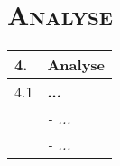 

\chapter{\textsc{Analyse} \label{analyse}}

\begin{table}[h] 
\begin{tabular}{@{}||l||l||@{}} \hline \hline 
 4.	 & \textbf{Analyse} \\ \hline \hline
 4.1 & \textbf{...} \\ 
 	 & \textit{ - ...} \\
	 & \textit{ - ...} \\ \hline \hline
\end{tabular} \end{table}







